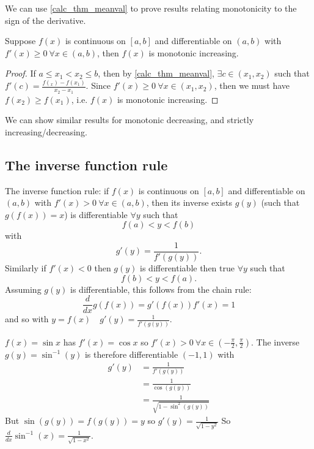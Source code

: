 \documentclass[10pt, a4paper]{article}
\begin{document}
We can use \autoref{calc_thm_meanval} to prove results relating monotonicity to the sign of the derivative.
    
\begin{example}
    Suppose $f(x)$ is continuous on $[a, b]$ and differentiable on $(a, b)$ with $f'(x) \geq 0\ \forall x \in (a, b)$, then $f(x)$ is monotonic increasing.
    \begin{proof}
        If $a \leq x_1 < x_2 \leq b$,
        then by \autoref{calc_thm_meanval},
        $\exists c \in (x_1, x_2)$ such that $f'(c) = \frac{f(_x) - f(x_1)}{x_2 - x_1}$.
        Since $f'(x) \geq 0\ \forall x \in (x_1, x_2)$,
        then we must have $f(x_2) \geq f(x_1)$, i.e. $f(x)$ is monotonic increasing.
    \end{proof}
\end{example}

We can show similar results for monotonic decreasing,
and strictly increasing/decreasing.

\subsection{The inverse function rule}
The inverse function rule: if $f(x)$ is continuous on $[a, b]$ and differentiable on $(a, b)$ with $f'(x) > 0\ \forall  x \in (a, b)$,
then its inverse exists $g(y)$
(such that $g(f(x)) = x$)
is differentiable $\forall y$ such that
\[
f(a) < y < f(b)
\]
with
\[
g'(y) = \frac{1}{f'(g(y))}.
\]
Similarly if $f'(x) < 0$ then $g(y)$ is differentiable then true $\forall y$ such that
\[
f(b) < y < f(a).
\]
Assuming $g(y)$ is differentiable, this follows from the chain rule:
\[
\frac{d}{dx}g(f(x)) = g'(f(x))f'(x) = 1
\]
and so with $y = f(x)\quad g'(y) = \frac{1}{f'(g(y))}$.

\begin{example}
    $f(x) = \sin x$ has $f'(x) = \cos x$ so $f'(x) > 0\ \forall x \in \left(-\frac{\pi}{2}, \frac{\pi}{2}\right)$.
    The inverse $g(y) = \sin ^ {-1}(y)$ is therefore differentiable $(-1, 1)$ with
    \begin{align*}
        g'(y) &= \frac{1}{f'(g(y))} \\
        &= \frac{1}{\cos(g(y))} \\
        &= \frac{1}{\sqrt{1 - \sin ^ 2 (g(y))}}
    \end{align*}
    But $\sin(g(y)) = f(g(y)) = y$ so
    $g'(y) = \frac{1}{\sqrt{1 - y ^ 2}}$
    So $\frac{d}{dx}\sin ^ {-1}(x) = \frac{1}{\sqrt{1 - x ^ 2}}$.
\end{example}
\end{document}
